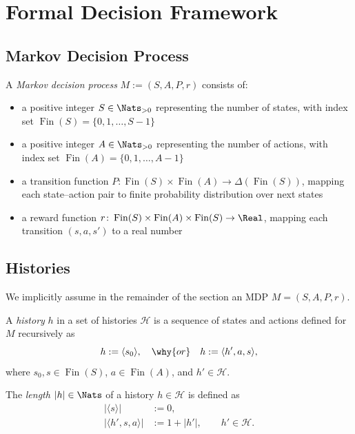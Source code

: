 \section{Formal Decision Framework}

\subsection{Markov Decision Process}

\newcommand{\Fin}{\operatorname{Fin}}

\begin{definition} \label{def:MDP}
A \emph{Markov decision process} $M := (S, A, P, r)$ consists of:
\begin{itemize}
  \item a positive integer $S \in \Nats_{>0}$ representing the number of states, with index set $\Fin(S) = \{0,1, \dots, S-1\}$
  \item a positive integer $A \in \Nats_{>0}$ representing the number of actions, with index set $\Fin(A) = \{0,1, \dots, A-1\}$
  \item a transition function $P \colon \Fin(S) \times \Fin(A) \to \Delta(\Fin(S))$, mapping each state–action pair to finite probability distribution over next states
  \item a reward function $r \colon \Fin(S) \times \Fin(A) \times \Fin(S) \to \Real$, mapping each transition \((s,a,s')\) to a real number
\end{itemize}
\end{definition}

\subsection{Histories}

We implicitly assume in the remainder of the section an MDP $M = (S, A, P, r)$.
\begin{definition} \label{def:Hist}
A \emph{history} $h$ in a set of histories $\mathcal{H}$ is a sequence of states and actions defined for $M$ recursively as
\[
  h := \langle s_0 \rangle, \quad
  \why{or} \quad
  h := \langle h', a, s \rangle,
\]
where $s_0, s \in \Fin(S)$, $a \in \Fin(A)$, and $h'\in \mathcal{H}$.
\end{definition}

\begin{definition} \label{def:hist-length}
The \emph{length} $|h|\in  \Nats$ of a history $h\in \mathcal{H}$ is defined as
\begin{align*}
|\langle s \rangle| &:= 0, \\
|\langle h', s, a \rangle| &:= 1 + |h'|, \qquad h' \in \mathcal{H}. 
\end{align*}
\end{definition}


